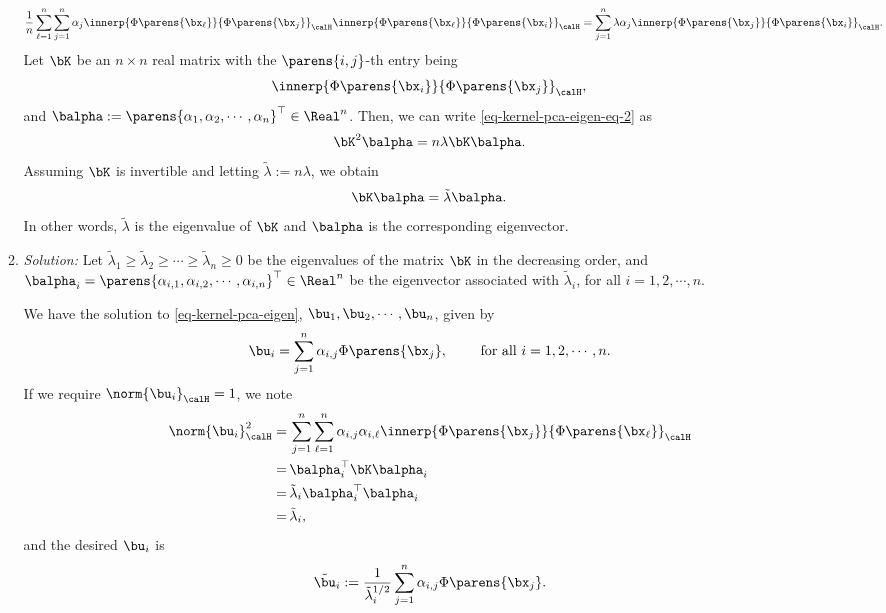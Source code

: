 \documentclass[12pt]{article}
\begin{document}
\begin{enumerate}[label=\textbf{\arabic*.}]
\begin{enumerate}
\begin{align}
			\frac{1}{n} \sum_{\ell=1}^n \sum_{j=1}^n \alpha_j \innerp{\Phi \parens{\bx_{\ell}}}{ \Phi \parens{\bx_j} }_{\calH} \innerp{\Phi \parens{\bx_{\ell}}}{\Phi \parens{\bx_i}}_{\calH} = \sum_{j=1}^n \lambda \alpha_j \innerp{\Phi \parens{\bx_j}}{\Phi \parens{\bx_i}}_{\calH}. 
		\end{align}
		Let $\bK$ be an $n \times n$ real matrix with the $\parens{i, j}$-th entry being 
		\begin{align*}
			\innerp{\Phi \parens{\bx_i}}{\Phi \parens{\bx_j}}_{\calH}, 
		\end{align*}
		and $\balpha := \parens{\alpha_1, \alpha_2, \cdots, \alpha_n}^\top \in \Real^n$. Then, we can write \eqref{eq-kernel-pca-eigen-eq-2} as 
		\begin{align*}
			\bK^2 \balpha = n \lambda \bK \balpha. 
		\end{align*}
		Assuming $\bK$ is invertible and letting $\tilde{\lambda} := n \lambda$, we obtain 
		\begin{align}
			\bK \balpha = \tilde{\lambda} \balpha. 
		\end{align}
		In other words, $\tilde{\lambda}$ is the eigenvalue of $\bK$ and $\balpha$ is the corresponding eigenvector. 
		
		\item \textit{Solution:} Let $\tilde{\lambda}_1 \ge \tilde{\lambda}_2 \ge \cdots \ge \tilde{\lambda}_n \ge 0$ be the eigenvalues of the matrix $\bK$ in the decreasing order, and $\balpha_i = \parens{\alpha_{i,1}, \alpha_{i,2}, \cdots, \alpha_{i,n}}^\top \in \Real^n$ be the eigenvector associated with $\tilde{\lambda}_i$, for all $i = 1, 2, \cdots, n$. 
		
		We have the solution to \eqref{eq-kernel-pca-eigen}, $\bu_1, \bu_2, \cdots, \bu_n$, given by 
		\begin{align*}
			\bu_i = \sum_{j=1}^n \alpha_{i,j} \Phi \parens{\bx_j}, \qquad \text{ for all } i = 1, 2, \cdots, n. 
		\end{align*}
		If we require $\norm{\bu_i}_{\calH} = 1$, we note 
		\begin{align*}
			\norm{\bu_i}_{\calH}^2 = & \, \sum_{j=1}^n \sum_{\ell=1}^n \alpha_{i,j} \alpha_{i,\ell} \innerp{\Phi \parens{\bx_j}}{\Phi \parens{\bx_{\ell}}}_{\calH} \\ 
			= & \, \balpha_i^\top \bK \balpha_i \\ 
			= & \, \tilde{\lambda}_i \balpha_i^\top \balpha_i \\ 
			= & \, \tilde{\lambda}_i, 
		\end{align*}
		and the desired $\bu_i$ is 
		\begin{align*}
			\tilde{\bu}_i := \frac{1}{\tilde{\lambda}_i^{1/2}} \sum_{j=1}^n \alpha_{i,j} \Phi \parens{\bx_j}. 
		\end{align*}
		

\end{enumerate}
\end{enumerate}
\end{document}
